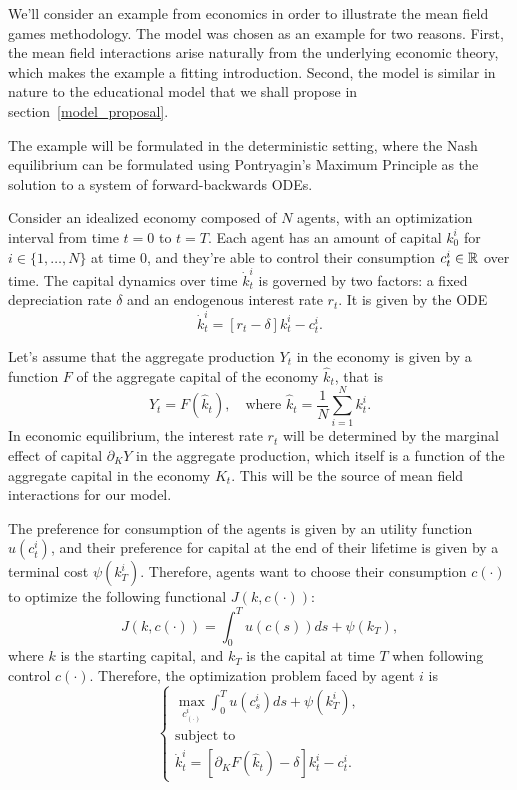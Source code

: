 
We'll consider an example from economics in order to illustrate the mean field games methodology.
The model was chosen as an example for two reasons.
First, the mean field interactions arise naturally from the underlying economic theory, which makes the example a fitting introduction.
Second, the model is similar in nature to the educational model that we shall propose in section~\ref{model_proposal}.

The example will be formulated in the deterministic setting, where the Nash equilibrium can be formulated using Pontryagin's Maximum Principle 
as the solution to a system of forward-backwards ODEs.

Consider an idealized economy composed of $N$ agents, with an optimization interval from time $t = 0$ to $t = T$.
Each agent has an amount of capital $k_0^i$ for $i \in \{1,\ldots,N\}$ at time $0$, and they're able to control their consumption $c_t^i \in \mathbb{R}$ over time.
The capital dynamics over time $\dot k_t^i$ is governed by two factors:
a fixed depreciation rate $\delta$ and an endogenous interest rate $r_t$. It is given by the ODE
\begin{equation}
    \dot k_t^i = \left[r_t - \delta \right] k_t^i - c_t^i. 
\end{equation}

Let's assume that the aggregate production $Y_t$ in the economy is given by a function $F$ of the aggregate capital of the economy $\hat k_t$, that is
\begin{equation}
    Y_t = F(\hat k_t),\quad \text{where } \hat k_t = \frac{1}{N} \sum_{i = 1}^N k_t^i.
\end{equation}
In economic equilibrium, the interest rate $r_t$ will be determined by the marginal effect of capital $\partial_K Y$ in the aggregate production,
which itself is a function of the aggregate capital in the economy $K_t$. This will be the source of mean field interactions for our model.

The preference for consumption of the agents is given by an utility function $u(c_t^i)$, 
and their preference for capital at the end of their lifetime is given by a terminal cost $\psi(k_T^i)$.
Therefore, agents want to choose their consumption $c(\cdot)$ to optimize the following functional $J(k, c(\cdot))$:
\begin{equation}
    J(k, c(\cdot)) = \int_0^T u(c(s)) ds + \psi(k_T),
\end{equation}
where $k$ is the starting capital, and $k_T$ is the capital at time $T$ when following control $c(\cdot)$.
Therefore, the optimization problem faced by agent $i$ is
\begin{equation}\label{economic_example:N_player_game}
    \begin{cases}
        \max_{c^i_{(\cdot)}} \int_0^T u(c^i_s) ds + \psi(k^i_T),\\
        \text{subject to}\\
        \dot k_t^i = \left[ \partial_K F(\hat k_t) - \delta \right] k_t^i - c_t^i.
    \end{cases}
\end{equation}

